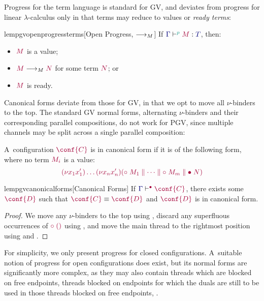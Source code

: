 \documentclass[main.tex]{subfiles}
\begin{document}
Progress for the term language is standard for GV, and deviates from progress for linear $\lambda$-calculus only in that terms may reduce to values or \emph{ready terms}:
\begin{restatablelemma}{lempgvopenprogressterms}[Open Progress, $\longrightarrow_{M}$]
  \label{lem:pgv-open-progress-terms}
  If $\tseq[\cs{p}]{\ty{\Gamma}}{M}{T}$, then:
  \begin{itemize}
  \item $\tm{M}$ is a value;
  \item $\tm{M}\tred\tm{N}$ for some term $\tm{N}$; or
  \item $\tm{M}$ is ready.
  \end{itemize}
\end{restatablelemma}

Canonical forms deviate from those for GV, in that we opt to move all $\nu$-binders to the top. The standard GV normal forms, alternating $\nu$-binders and their corresponding parallel compositions, do not work for PGV, since multiple channels may be split across a single parallel composition:
\begin{definition}
  \label{def:pgv-canonical-forms}
  A~configuration $\tm{\conf{C}}$ is in canonical form if it is of the following form, where no term $\tm{M_i}$ is a value:
  \[
    \tm{\res{x_1}{x'_1}{\dots\res{x_n}{x'_n}{(\child\;M_1\parallel\dots\parallel\child\;M_m\parallel\main\;N)}}}
  \]
\end{definition}
\begin{restatablelemma}{lempgvcanonicalforms}[Canonical Forms]
  \label{lem:pgv-canonical-forms}
  If $\cseq[\main]{\ty{\Gamma}}{\conf{C}}$, there exists some $\tm{\conf{D}}$ such that $\tm{\conf{C}}\equiv\tm{\conf{D}}$ and $\tm{\conf{D}}$ is in canonical form.
\end{restatablelemma}
\begin{proof}
  We move any $\nu$-binders to the top using , discard any superfluous occurrences of $\tm{\child\;\unit}$ using , and move the main thread to the rightmost position using  and .
\end{proof}

For simplicity, we only present progress for closed configurations. A~suitable notion of progress for open configurations does exist, but its normal forms are significantly more complex, as they may also contain threads which are blocked on free endpoints, threads blocked on endpoints for which the duals are still to be used in those threads blocked on free endpoints, \etc.
\end{document}
